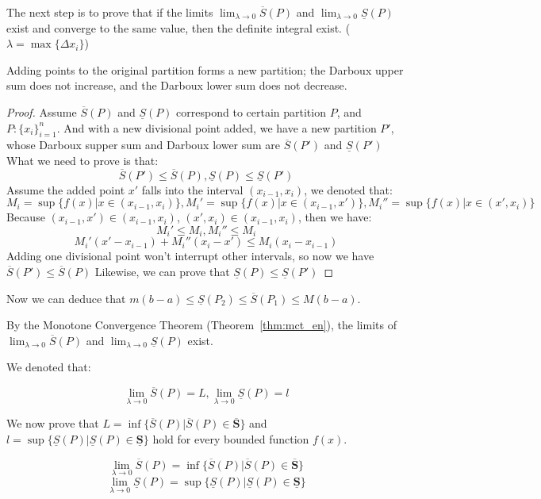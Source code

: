 The next step is to prove that if the limits $\lim_{\lambda \to 0} \overline{S}(P)$ and $\lim_{\lambda \to 0} \underline{S}(P)$ exist and converge to the same value, then the definite integral exist. ($\lambda = \max \{\Delta x_i\}$)

\begin{lemma}
Adding points to the original partition forms a new partition; the Darboux upper sum does not increase, and the Darboux lower sum does not decrease.
\end{lemma}

\begin{proof}
Assume $\overline{S}(P)$ and $\underline{S}(P)$ correspond to certain partition $P$, and $P: \{x_i\}_{i=1}^n$. And with a new divisional point added, we have a new partition $P'$, whose Darboux supper sum and Darboux lower sum are $\overline{S}(P')$ and $\underline{S}(P')$
What we need to prove is that:
\[
\overline{S}(P') \leq \overline{S}(P), \underline{S}(P) \leq \underline{S}(P')
\]
Assume the added point $x'$ falls into the interval $(x_{i-1},x_i)$, we denoted that:
\[
M_i = \sup \{f(x)|x \in (x_{i-1},x_i)\}, M_i' = \sup \{f(x)|x \in (x_{i-1},x')\}, M_i'' = \sup \{f(x)| x \in (x', x_i)\}
\]
Because $(x_{i-1},x') \in (x_{i-1},x_i)$, $(x', x_i) \in (x_{i-1},x_i)$, then we have:
\[
M_i' \leq M_i, M_i'' \leq M_i
\]
\[
M_i'(x'-x_{i-1}) + M_i''(x_i-x') \leq M_i(x_i - x_{i-1})
\]
Adding one divisional point won't interrupt other intervals, so now we have $\overline{S}(P') \leq \overline{S}(P)$
Likewise, we can prove that $\underline{S}(P) \leq \underline{S}(P')$

\end{proof}

Now we can deduce that $m(b-a) \leq \underline{S}(P_2) \leq \overline{S}(P_1) \leq M(b-a)$.

By the Monotone Convergence Theorem (Theorem~\ref{thm:mct_en}), the limits of $\lim_{\lambda \to 0} \overline{S}(P)$ and $\lim_{\lambda \to 0} \underline{S}(P)$ exist.

We denoted that:

\[
\lim_{\lambda \to 0} \overline{S}(P)=L, \lim_{\lambda \to 0} \underline{S}(P)=l
\]

We now prove that $L = \inf \{\overline{S}(P)|\overline{S}(P) \in \overline{\textbf{S}}\}$ and $l = \sup \{\underline{S}(P)|\underline{S}(P) \in \underline{\textbf{S}}\}$ hold for every bounded function $f(x)$.

\begin{lemma}
\[\lim_{\lambda \to 0} \overline{S}(P) = \inf \{\overline{S}(P)|\overline{S}(P) \in \overline{\textbf{S}}\}\]
\[\lim_{\lambda \to 0} \underline{S}(P) = \sup \{\underline{S}(P)|\underline{S}(P) \in \underline{\textbf{S}}\}\]
\end{lemma}

